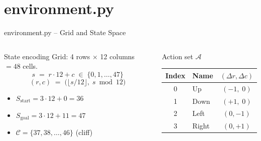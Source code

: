 \documentclass[aspectratio=169,8pt]{beamer}
\newcommand{\Act}{\mathcal{A}}
\begin{document}
\section{environment.py}

\begin{frame}[shrink=5]{environment.py -- Grid and State Space}
  \begin{columns}[T]
    \begin{block}{State encoding}
      Grid: 4 rows $\times$ 12 columns $= 48$ cells.
      \[
        s \;=\; r\cdot 12 + c
        \;\in\; \{0,1,\ldots,47\}
      \]
      \[
        (r,c) \;=\; \bigl(\lfloor s/12\rfloor,\; s\bmod 12\bigr)
      \]
      \begin{itemize}
        \item $S_{\text{start}} = 3\cdot12+0 = 36$
        \item $S_{\text{goal}}  = 3\cdot12+11= 47$
        \item $\mathcal{C}=\{37,38,\ldots,46\}$ (cliff)
      \end{itemize}
    \end{block}
    \begin{block}{Action set $\Act$}
      \small
      \begin{tabular}{clc}
        \toprule
        Index & Name  & $(\Delta r,\Delta c)$ \\
        \midrule
        0 & Up    & $(-1,\;0)$ \\
        1 & Down  & $(+1,\;0)$ \\
        2 & Left  & $(0,-1)$   \\
        3 & Right & $(0,+1)$   \\
        \bottomrule
      \end{tabular}
    \end{block}


\end{columns}
\end{frame}
\end{document}

